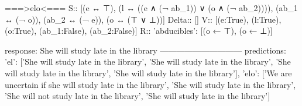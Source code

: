 ===>elo<===
S:: [(e ↔ ⊤), (l ↔ ((e ∧ (¬ ab_1)) ∨ (o ∧ (¬ ab_2)))), (ab_1 ↔ (¬ o)), (ab_2 ↔ (¬ e)), (o ↔ (⊤ ∨ ⊥))]
Delta:: []
V:: [(e:True), (l:True), (o:True), (ab_1:False), (ab_2:False)]
R:: {'abducibles': [(o ← ⊤), (o ← ⊥)]}

response: She will study late in the library
------------------------------
predictions:  {'el': ['She will study late in the library', 'She will study late in the library', 'She will study late in the library', 'She will study late in the library'], 'elo': ['We are uncertain if she will study late in the library', 'She will study late in the library', 'She will not study late in the library', 'She will study late in the library']}